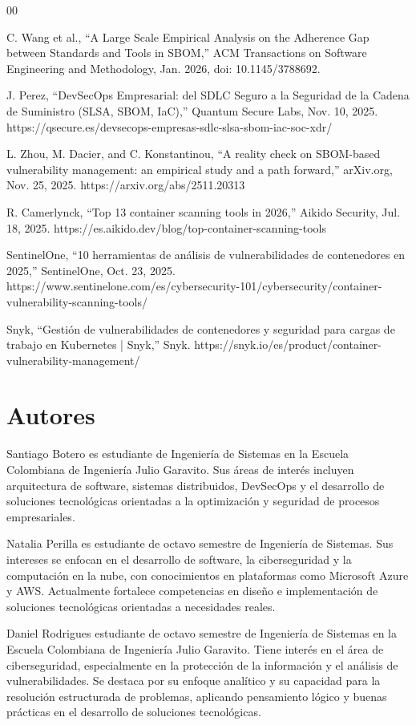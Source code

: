 \documentclass[journal]{IEEEtran}
\begin{document}
\begin{thebibliography}{00}

C. Wang et al., “A Large Scale Empirical Analysis on the Adherence Gap between Standards and Tools in SBOM,” ACM Transactions on Software Engineering and Methodology, Jan. 2026, doi: 10.1145/3788692.

J. Perez, “DevSecOps Empresarial: del SDLC Seguro a la Seguridad de la Cadena de Suministro (SLSA, SBOM, IaC),” Quantum Secure Labs, Nov. 10, 2025. https://qsecure.es/devsecops-empresas-sdlc-slsa-sbom-iac-soc-xdr/

L. Zhou, M. Dacier, and C. Konstantinou, “A reality check on SBOM-based vulnerability management: an empirical study and a path forward,” arXiv.org, Nov. 25, 2025. https://arxiv.org/abs/2511.20313

R. Camerlynck, “Top 13 container scanning tools in 2026,” Aikido Security, Jul. 18, 2025. https://es.aikido.dev/blog/top-container-scanning-tools

SentinelOne, “10 herramientas de análisis de vulnerabilidades de contenedores en 2025,” SentinelOne, Oct. 23, 2025. https://www.sentinelone.com/es/cybersecurity-101/cybersecurity/container-vulnerability-scanning-tools/

Snyk, “Gestión de vulnerabilidades de contenedores y seguridad para cargas de trabajo en Kubernetes | Snyk,” Snyk. https://snyk.io/es/product/container-vulnerability-management/

\end{thebibliography}

\section*{Autores}

Santiago Botero es estudiante de Ingeniería de Sistemas en la Escuela Colombiana de Ingeniería Julio Garavito. Sus áreas de interés incluyen arquitectura de software, sistemas distribuidos, DevSecOps y el desarrollo de soluciones tecnológicas orientadas a la optimización y seguridad de procesos empresariales.

Natalia Perilla es estudiante de octavo semestre de Ingeniería de Sistemas. Sus intereses se enfocan en el desarrollo de software, la ciberseguridad y la computación en la nube, con conocimientos en plataformas como Microsoft Azure y AWS. Actualmente fortalece competencias en diseño e implementación de soluciones tecnológicas orientadas a necesidades reales.

Daniel Rodrigues estudiante de octavo semestre de Ingeniería de Sistemas en la Escuela Colombiana de Ingeniería Julio Garavito. Tiene interés en el área de ciberseguridad, especialmente en la protección de la información y el análisis de vulnerabilidades. Se destaca por su enfoque analítico y su capacidad para la resolución estructurada de problemas, aplicando pensamiento lógico y buenas prácticas en el desarrollo de soluciones tecnológicas.
\end{document}
